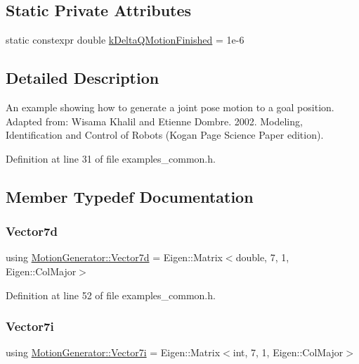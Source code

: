 \subsection*{Static Private Attributes}
\begin{DoxyCompactItemize}
\item 
static constexpr double \hyperlink{classMotionGenerator_a03e73e0857236b6e3061457bc969efb2}{k\+Delta\+Q\+Motion\+Finished} = 1e-\/6
\end{DoxyCompactItemize}


\subsection{Detailed Description}
An example showing how to generate a joint pose motion to a goal position. Adapted from\+: Wisama Khalil and Etienne Dombre. 2002. Modeling, Identification and Control of Robots (Kogan Page Science Paper edition). 

Definition at line 31 of file examples\+\_\+common.\+h.



\subsection{Member Typedef Documentation}
\mbox{\label{classMotionGenerator_a499bd17d3a5c7583b4c06923f532185d}} 
\subsubsection{\texorpdfstring{Vector7d}{Vector7d}}
{\footnotesize\ttfamily using \hyperlink{classMotionGenerator_a499bd17d3a5c7583b4c06923f532185d}{Motion\+Generator\+::\+Vector7d} =  Eigen\+::\+Matrix$<$double, 7, 1, Eigen\+::\+Col\+Major$>$\hspace{0.3cm}{\ttfamily [private]}}



Definition at line 52 of file examples\+\_\+common.\+h.

\mbox{\label{classMotionGenerator_ad0a869ececb7689b512dbfbf8f507924}} 
\subsubsection{\texorpdfstring{Vector7i}{Vector7i}}
{\footnotesize\ttfamily using \hyperlink{classMotionGenerator_ad0a869ececb7689b512dbfbf8f507924}{Motion\+Generator\+::\+Vector7i} =  Eigen\+::\+Matrix$<$int, 7, 1, Eigen\+::\+Col\+Major$>$\hspace{0.3cm}{\ttfamily [private]}}




